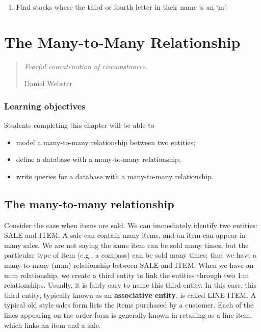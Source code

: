 \documentclass[
]{article}
\providecommand{\tightlist}{%
  \setlength{\itemsep}{0pt}\setlength{\parskip}{0pt}}
\begin{document}
\begin{enumerate}
\def\labelenumi{\arabic{enumi}.}
\setcounter{enumi}{8}
\tightlist
\item
  Find stocks where the third or fourth letter in their name is an `m'.
\end{enumerate}

\hypertarget{the-many-to-many-relationship}{%
\section{The Many-to-Many
Relationship}\label{the-many-to-many-relationship}}

\begin{quote}
\emph{Fearful concatenation of circumstances.}

Daniel Webster
\end{quote}

\hypertarget{learning-objectives-2}{%
\subsubsection*{Learning objectives}\label{learning-objectives-2}}

Students completing this chapter will be able to

\begin{itemize}
\tightlist
\item
  model a many-to-many relationship between two entities;
\item
  define a database with a many-to-many relationship;
\item
  write queries for a database with a many-to-many relationship.
\end{itemize}

\hypertarget{the-many-to-many-relationship-1}{%
\subsection{The many-to-many
relationship}\label{the-many-to-many-relationship-1}}

Consider the case when items are sold. We can immediately identify two
entities: SALE and ITEM. A sale can contain many items, and an item can
appear in many sales. We are not saying the same item can be sold many
times, but the particular type of item (e.g., a compass) can be sold
many times; thus we have a many-to-many (m:m) relationship between SALE
and ITEM. When we have an m:m relationship, we create a third entity to
link the entities through two 1:m relationships. Usually, it is fairly
easy to name this third entity. In this case, this third entity,
typically known as an \textbf{associative entity}, is called LINE ITEM.
A typical old style sales form lists the items purchased by a customer.
Each of the lines appearing on the order form is generally known in
retailing as a line item, which links an item and a sale.
\end{document}

